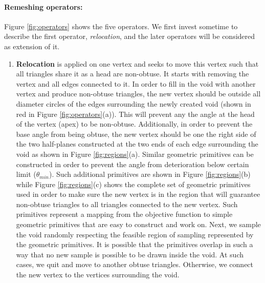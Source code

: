 \documentclass[a4paper,10pt]{article}
\begin{document}
\paragraph{Remeshing operators:}
Figure \ref{fig:operators} shows the five operators. We first invest sometime to describe the first operator, \emph{relocation}, and the later operators will be considered as extension of it. 

\begin{enumerate}
\item \textbf{Relocation} is applied on one vertex and seeks to move this vertex such that all triangles share it as a head are non-obtuse. It starts with removing the vertex and all edges connected to it. In order to fill in the void with another vertex and produce non-obtuse triangles, the new vertex should be outside all diameter circles of the edges surrounding the newly created void (shown in red in Figure \ref{fig:operators}(a)). This will prevent any the angle at the head of the vertex (apex) to be non-obtuse. Additionally, in order to prevent the base angle from being obtuse, the new vertex should be one the right side of the two half-planes constructed at the two ends of each edge surrounding the void as shown in Figure \ref{fig:regions}(a). Similar geometric primitives can be constructed in order to prevent the angle from deterioration below certain limit ($\theta_{min}$). Such additional primitives are shown in Figure \ref{fig:regions}(b) while Figure \ref{fig:regions}(c) shows the complete set of geometric primitives used in order to make sure the new vertex is in the region that will guarantee non-obtuse triangles to all triangles connected to the new vertex. Such primitives represent a mapping from the objective function to simple geometric primitives that are easy to construct and work on. Next, we sample the void randomly respecting the feasible region of sampling represented by the geometric primitives. It is possible that the primitives overlap in such a way that no new sample is possible to be drawn inside the void. At such cases, we quit and move to another obtuse triangles. Otherwise, we connect the new vertex to the vertices surrounding the void. 


\end{enumerate}
\end{document}
